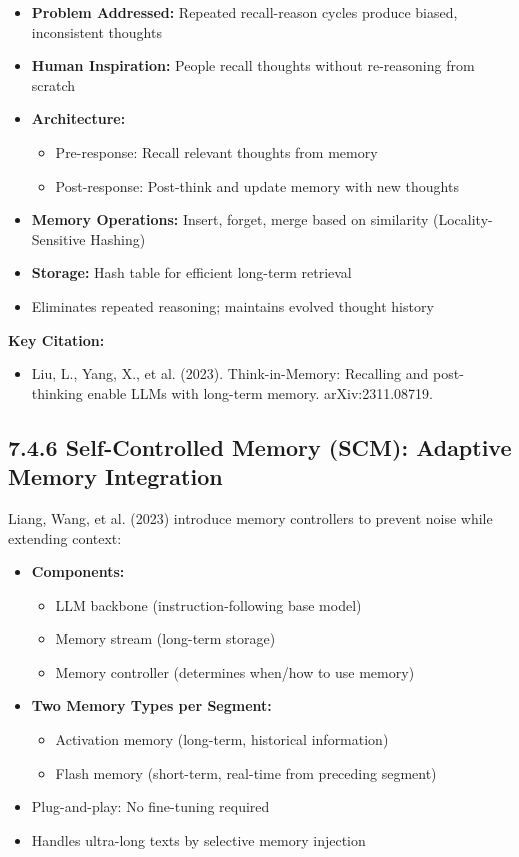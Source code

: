 \documentclass[11pt,letterpaper]{article}
\begin{document}
\begin{itemize}[leftmargin=*]
    \item \textbf{Problem Addressed:} Repeated recall-reason cycles produce biased, inconsistent thoughts
    \item \textbf{Human Inspiration:} People recall thoughts without re-reasoning from scratch
    \item \textbf{Architecture:}
    \begin{itemize}
        \item Pre-response: Recall relevant thoughts from memory
        \item Post-response: Post-think and update memory with new thoughts
    \end{itemize}
    \item \textbf{Memory Operations:} Insert, forget, merge based on similarity (Locality-Sensitive Hashing)
    \item \textbf{Storage:} Hash table for efficient long-term retrieval
    \item Eliminates repeated reasoning; maintains evolved thought history
\end{itemize}

\textbf{Key Citation:}
\begin{itemize}[leftmargin=*]
    \item Liu, L., Yang, X., et al. (2023). Think-in-Memory: Recalling and post-thinking enable LLMs with long-term memory. arXiv:2311.08719.
\end{itemize}

\subsection{7.4.6 Self-Controlled Memory (SCM): Adaptive Memory Integration}

Liang, Wang, et al. (2023) introduce memory controllers to prevent noise while extending context:

\begin{itemize}[leftmargin=*]
    \item \textbf{Components:}
    \begin{itemize}
        \item LLM backbone (instruction-following base model)
        \item Memory stream (long-term storage)
        \item Memory controller (determines when/how to use memory)
    \end{itemize}
    \item \textbf{Two Memory Types per Segment:}
    \begin{itemize}
        \item Activation memory (long-term, historical information)
        \item Flash memory (short-term, real-time from preceding segment)
    \end{itemize}
    \item Plug-and-play: No fine-tuning required
    \item Handles ultra-long texts by selective memory injection
\end{itemize}
\end{document}

